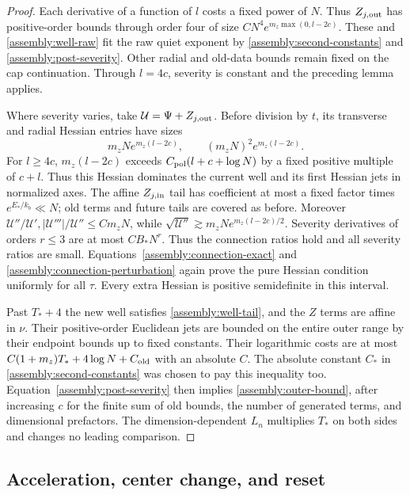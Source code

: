 \begin{proof}
Each derivative of a function of $l$ costs a fixed power of $N$.
Thus $Z_{j,\rm out}$ has positive-order bounds through order four
of size $C N^4e^{m_z\max(0,l-2c)}$. These and
\eqref{assembly:well-raw} fit the raw quiet exponent by
\eqref{assembly:second-constants} and \eqref{assembly:post-severity}.
Other radial and old-data bounds remain fixed on the cap
continuation. Through $l=4c$, severity is constant and the preceding
lemma applies.

Where severity varies, take $\mathcal U=\Psi+Z_{j,\rm out}$.
Before division by $t$, its transverse and radial Hessian entries
have sizes
\[
 m_zN e^{m_z(l-2c)},\qquad
 (m_zN)^2e^{m_z(l-2c)}.
\]
For $l\geq4c$, $m_z(l-2c)$ exceeds
$C_{\rm pol}(l+c+\log N)$ by a fixed positive multiple of $c+l$.
Thus this Hessian dominates the current well and its first
Hessian jets in normalized axes.
The affine $Z_{j,\rm in}$ tail has coefficient at most a fixed
factor times $e^{E_*/k_b}\ll N$; old terms and future tails are
covered as before. Moreover
$\mathcal U''/\mathcal U',|\mathcal U'''|/\mathcal U''\leq Cm_zN$,
while $\sqrt{\mathcal U''}\gtrsim
m_zN e^{m_z(l-2c)/2}$.
Severity derivatives of orders $r\leq3$ are at most $CB_*N^r$.
Thus the connection ratios hold and all severity ratios are small.
Equations~\eqref{assembly:connection-exact} and
\eqref{assembly:connection-perturbation} again prove the pure
Hessian condition uniformly for all $\tau$. Every extra Hessian
is positive semidefinite in this interval.

Past $T_*+4$ the new well satisfies \eqref{assembly:well-tail},
and the $Z$ terms are affine in $\nu$. Their positive-order
Euclidean jets are bounded on the entire outer range by their
endpoint bounds up to fixed constants. Their logarithmic costs
are at most
$C(1+m_z)T_*+4\log N+C_{\rm old}$ with an absolute $C$.
The absolute constant $C_*$ in \eqref{assembly:second-constants}
was chosen to pay this inequality too.
Equation~\eqref{assembly:post-severity} then implies
\eqref{assembly:outer-bound}, after increasing $c$ for the finite
sum of old bounds, the number of generated terms, and dimensional
prefactors. The dimension-dependent $L_n$
multiplies $T_*$ on both sides and changes no leading comparison.
\end{proof}

\subsection{Acceleration, center change, and reset}

